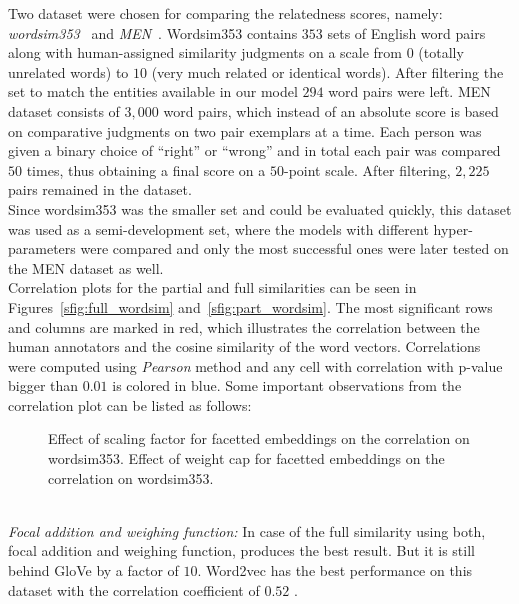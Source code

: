 Two dataset were chosen for comparing the relatedness scores, namely: \emph{wordsim353}~\cite{DBLP:conf/www/FinkelsteinGMRSWR01} and \emph{MEN}~\cite{DBLP:journals/jair/BruniTB14}. Wordsim353 contains $353$ sets of English word pairs along with human-assigned similarity judgments on a scale from $0$ (totally unrelated words) to $10$ (very much related or identical words). After filtering the set to match the entities available in our model $294$ word pairs were left. MEN dataset consists of
$3,000$ word pairs, which instead of an absolute score is based on comparative judgments on two pair exemplars at a time. Each person was given a binary choice of ``right'' or ``wrong'' and in total each pair was compared $50$ times, thus obtaining a final score on a $50$-point scale. After filtering, $2,225$ pairs remained in the dataset.\\
Since wordsim353 was the smaller set and could be evaluated quickly, this dataset was used as a semi-development set, where the models with different hyper-parameters were compared and only the most successful ones were later tested on the MEN dataset as well. \\
Correlation plots for the partial and full similarities can be seen in Figures~\ref{sfig:full_wordsim} and~\ref{sfig:part_wordsim}. The most significant rows and columns are marked in red, which illustrates the correlation between the human annotators and the cosine similarity of the word vectors. Correlations were computed using \emph{Pearson} method and any cell with correlation with p-value bigger than $0.01$ is colored in blue.
Some important observations from the correlation plot can be listed as follows:\\
\begin{figure}[hb]
\centering
\subcaptionbox{\label{sfig:scaling_f}}{
\resizebox{0.45\textwidth}{0.30\textwidth}{      

}}
\subcaptionbox{\label{sfig:weight_cap}}{\resizebox{0.45\textwidth}{0.30\textwidth}{      

}}

\caption{ Effect of scaling factor for facetted embeddings on the correlation on wordsim353.  Effect of weight cap for facetted embeddings on the correlation on wordsim353.}
\label{fig:correlation_change}
\end{figure}
\\
\emph{Focal addition and weighing function:} In case of the full similarity using both, focal addition and weighing function, produces the best result. But it is still behind GloVe by a factor of $10$. Word2vec has the best performance on this dataset with the correlation coefficient of $0.52$ .
